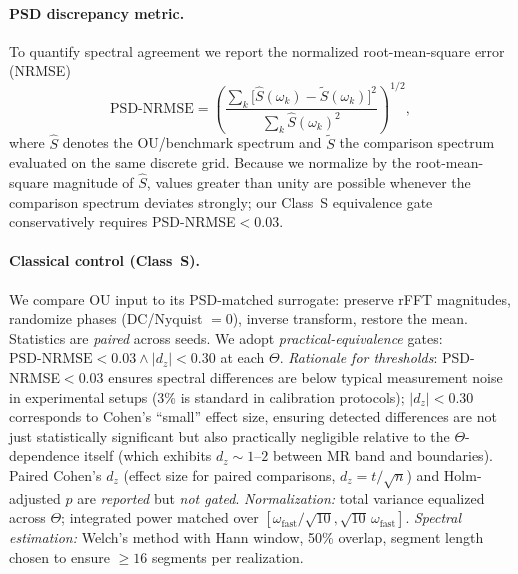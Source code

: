 \documentclass[11pt,letterpaper]{article}
\DeclareRobustCommand{\classS}{\textbf{Class~S}\xspace}
\DeclareRobustCommand{\GatePSD}{\ensuremath{\text{PSD-NRMSE}<0.03}\xspace}
\DeclareRobustCommand{\GateDZ}{\ensuremath{\lvert d_z\rvert<0.30}\xspace}
\DeclareRobustCommand{\GateEQ}{\ensuremath{\GatePSD \wedge \GateDZ}\xspace}
\begin{document}
\paragraph*{PSD discrepancy metric.}
To quantify spectral agreement we report the normalized root-mean-square error (NRMSE)
\begin{equation}
\mathrm{PSD\text{-}NRMSE}=\left(\frac{\sum_k \bigl[\hat S(\omega_k)-\tilde S(\omega_k)\bigr]^2}{\sum_k \hat S(\omega_k)^2}\right)^{1/2},
\end{equation}
where $\hat S$ denotes the OU/benchmark spectrum and $\tilde S$ the comparison spectrum evaluated on the same discrete grid. Because we normalize by the root-mean-square magnitude of $\hat S$, values greater than unity are possible whenever the comparison spectrum deviates strongly; our Class~S equivalence gate conservatively requires PSD-NRMSE$<0.03$.

\paragraph*{Classical control (\classS).}
We compare OU input to its PSD-matched surrogate: preserve rFFT magnitudes, randomize phases (DC/Nyquist $=0$), inverse transform, restore the mean. Statistics are \emph{paired} across seeds. We adopt \emph{practical-equivalence} gates: \GateEQ{} at each $\Theta$. \emph{Rationale for thresholds}: PSD-NRMSE$<$0.03 ensures spectral differences are below typical measurement noise in experimental setups (3\% is standard in calibration protocols); $|d_z|<$0.30 corresponds to Cohen's ``small'' effect size, ensuring detected differences are not just statistically significant but also practically negligible relative to the $\Theta$-dependence itself (which exhibits $d_z\!\sim\!1$--$2$ between MR band and boundaries). Paired Cohen's $d_z$ (effect size for paired comparisons, $d_z=t/\sqrt{n}$) and Holm-adjusted $p$ are \emph{reported} but \emph{not gated}. \emph{Normalization:} total variance equalized across $\Theta$; integrated power matched over $[\omega_{\mathrm{fast}}/\sqrt{10},\sqrt{10}\,\omega_{\mathrm{fast}}]$. \emph{Spectral estimation:} Welch's method with Hann window, 50\% overlap, segment length chosen to ensure $\ge 16$ segments per realization.
\end{document}
